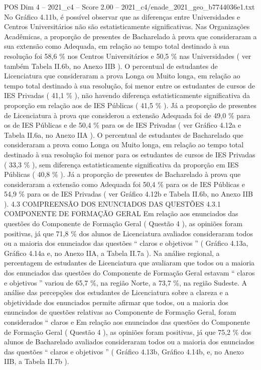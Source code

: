 \begin{textsample}{POS Dim 4 – 2021\_c4 – Score 2.00 – 2021\_c4/enade\_2021\_geo\_b7744036e1.txt}
No Gráfico 4.11b, é possível observar que as diferenças entre Universidades e Centros Universitários não são estatisticamente significativas.
Nas Organizações Acadêmicas, a proporção de presentes de Bacharelado à prova que consideraram a sua extensão como Adequada, em relação ao tempo total destinado à sua resolução foi 58,6 \% nos Centros Universitários e 50,5 \% nas Universidades ( ver também Tabela II.6b, no Anexo IIB ).
O percentual de estudantes de Licenciatura que consideraram a prova Longa ou Muito longa, em relação ao tempo total destinado à sua resolução, foi menor entre os estudantes de cursos de IES Privadas ( 41,1 \% ), não havendo diferença estatisticamente significativa da proporção em relação aos de IES Públicas ( 41,5 \% ).
Já a proporção de presentes de Licenciatura à prova que considerou a extensão Adequada foi de 49,0 \% para os de IES Públicas e de 50,4 \% para os de IES Privadas ( ver Gráfico 4.12a e Tabela II.6a, no Anexo IIA ).
O percentual de estudantes de Bacharelado que consideraram a prova como Longa ou Muito longa, em relação ao tempo total destinado à sua resolução foi menor para os estudantes de cursos de IES Privadas ( 33,3 \% ), sem diferença estatisticamente significativa da proporção em IES Públicas ( 40,8 \% ).
Já a proporção de presentes de Bacharelado à prova que consideraram a extensão como Adequada foi 50,4 \% para os de IES Públicas e 54,9 \% para os de IES Privadas ( ver Gráfico 4.12b e Tabela II.6b, no Anexo IIB ). 4.3 COMPREENSÃO DOS ENUNCIADOS DAS QUESTÕES 4.3.1 COMPONENTE DE FORMAÇÃO GERAL Em relação aos enunciados das questões do Componente de Formação Geral ( Questão 4 ), as opiniões foram positivas, já que 71,8 \% dos alunos de Licenciatura avaliados consideraram todos ou a maioria dos enunciados das questões “ claros e objetivos ” ( Gráfico 4.13a, Gráfico 4.14a e, no Anexo IIA, a Tabela II.7a ).
Na análise regional, a percentagem de estudantes de Licenciatura que avaliaram que todos ou a maioria dos enunciados das questões do Componente de Formação Geral estavam “ claros e objetivos ” variou de 65,7 \%, na região Norte, a 73,7 \%, na região Sudeste.
A análise das percepções dos estudantes de Licenciatura sobre a clareza e a objetividade dos enunciados permite afirmar que todos, ou a maioria dos enunciados de questões relativas ao Componente de Formação Geral, foram considerados “ claros e Em relação aos enunciados das questões do Componente de Formação Geral ( Questão 4 ), as opiniões foram positivas, já que 75,2 \% dos alunos de Bacharelado avaliados consideraram todos ou a maioria dos enunciados das questões “ claros e objetivos ” ( Gráfico 4.13b, Gráfico 4.14b, e, no Anexo IIB, a Tabela II.7b ).

\end{textsample}
